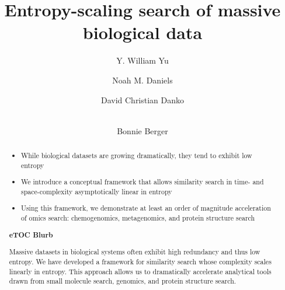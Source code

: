 \documentclass[review,preprint,12pt]{elsarticle}
\theoremstyle{definition}
\theoremstyle{remark}
\numberwithin{equation}{section}
\begin{document}
\begin{frontmatter}

\title{ %
Entropy-scaling search of massive biological data}

\author[mitmath,mitcsail]{Y. William Yu}
\author[mitmath,mitcsail]{Noah M. Daniels}
\author[mitcsail]{David Christian Danko}
\author[mitmath,mitcsail]{\\Bonnie Berger}
\address[mitmath]{Department of Mathematics, Massachusetts Institute of Technology, Cambridge, Massachusetts 02139}
\address[mitcsail]{Computer Science and AI Lab, Massachusetts Institute of Technology, Cambridge, Massachusetts 02139}






\begin{abstract}
    \begin{itemize}
        \item While biological datasets are growing dramatically, they tend to exhibit low entropy
        \item We introduce a conceptual framework that allows similarity search in time- and space-complexity asymptotically linear in entropy
        \item Using this framework, we demonstrate at least an order of magnitude acceleration of omics search: chemogenomics, metagenomics, and protein structure search
    \end{itemize}
\noindent\unskip\textbf{eTOC Blurb}
\par\medskip\noindent\unskip\ignorespaces
Massive datasets in biological systems often exhibit high redundancy and thus low entropy.
We have developed a framework for similarity search whose complexity scales linearly in entropy.
This approach allows us to dramatically accelerate analytical tools drawn from small molecule search, genomics, and protein structure search.
\end{abstract}

\end{frontmatter}
\end{document}
